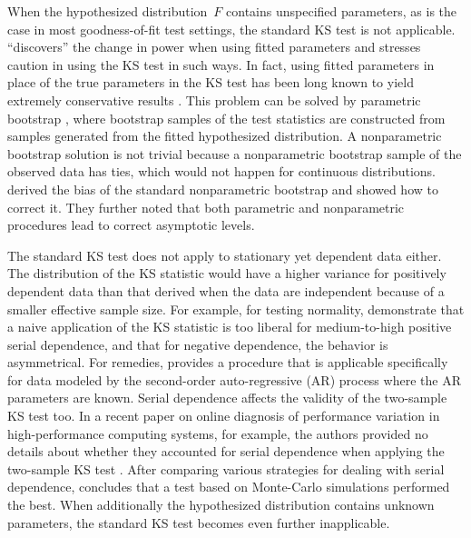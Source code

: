 \documentclass[12pt, letterpaper]{article}
\begin{document}
When the hypothesized distribution~$F$ contains unspecified parameters, as is
the case in most goodness-of-fit test settings, the standard KS test is not
applicable. \citet{steinskog2007cautionary} ``discovers'' the change in power
when using fitted parameters and stresses caution in using the KS test in
such ways. In fact, using fitted parameters in place of the true parameters in
the KS test has been long known to yield extremely conservative results
\citep[e.g.,][]{lilliefors1967kolmogorov}. This problem can be solved by
parametric bootstrap \citep{efron1985bootstrap, hall1991two}, where
bootstrap samples of the test statistics are constructed from samples
generated from the fitted hypothesized distribution. A nonparametric bootstrap
solution is not trivial because a nonparametric bootstrap sample of the
observed data has ties, which would not happen for continuous distributions.
\citet{babu2004goodness} derived the bias of the standard nonparametric 
bootstrap and
showed how to correct it. They further noted that both parametric and
nonparametric procedures lead to correct asymptotic levels.


The standard KS test does not apply to stationary yet dependent data either. The
distribution of the KS statistic would have a higher variance for positively
dependent data than that derived when the data are independent because of a
smaller effective sample size. For example, for testing normality,
\citet{durilleul1992lack} demonstrate that a naive application of
the KS statistic is too liberal for medium-to-high positive serial dependence,
and that for negative dependence, the behavior is asymmetrical. For remedies,
\citet{weiss1978modification} provides a procedure that is applicable 
specifically for data
modeled by the second-order auto-regressive (AR) process where the AR parameters
are known. Serial dependence affects the validity of the two-sample KS test too.
In a recent paper on online diagnosis of performance variation in
high-performance computing systems, for example, the authors provided no details
about whether they accounted for serial dependence when applying the two-sample
KS test \citep{tuncer2019online}. After comparing various strategies for dealing
with serial dependence, \citet{lanzante2021testing} concludes that a test based
on Monte-Carlo simulations performed the best.
When additionally the hypothesized distribution contains unknown
parameters, the standard KS test becomes even further inapplicable. 
\end{document}
